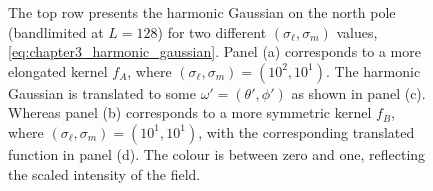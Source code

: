 \begin{figure}[htpb]
	\caption[
	Two harmonic Gaussians on the north pole and then translated
	]{
	The top row presents the harmonic Gaussian on the north pole (bandlimited at \(L=128\)) for two different \((\sigma_{\ell},\sigma_{m})\) values, \cf{} \cref{eq:chapter3_harmonic_gaussian}.
	Panel (a) corresponds to a more elongated kernel \(f_{A}\), where \((\sigma_{\ell},\sigma_{m}) = (10^{2},10^{1})\).
	The harmonic Gaussian is translated to some \(\omega'=(\theta',\phi')\) as shown in panel (c).
	Whereas panel (b) corresponds to a more symmetric kernel \(f_{B}\), where \((\sigma_{\ell},\sigma_{m}) = (10^{1},10^{1})\), with the corresponding translated function in panel (d).
	The colour is between zero and one, reflecting the scaled intensity of the field.
	}\label{fig:chapter3_harmonic_gaussian}
\end{figure}
